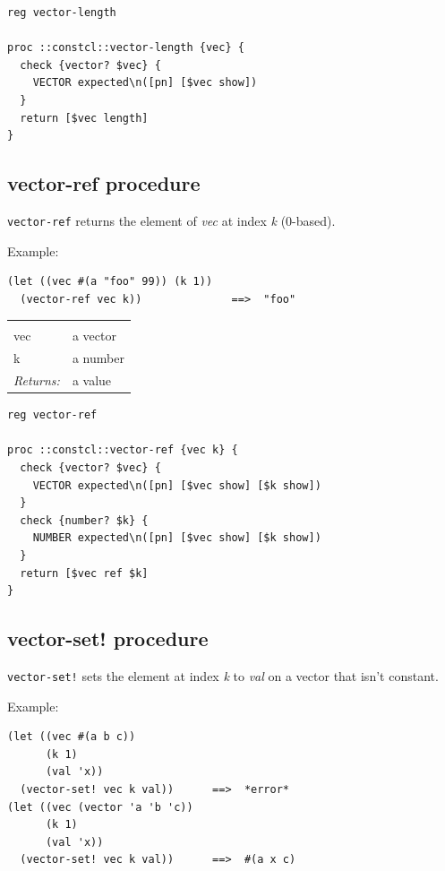 \documentclass[twoside]{report}
\begin{document}
\begin{lstlisting}
reg vector-length

proc ::constcl::vector-length {vec} {
  check {vector? $vec} {
    VECTOR expected\n([pn] [$vec show])
  }
  return [$vec length]
}
\end{lstlisting}

\subsection{vector-ref procedure}
\label{vectorref-procedure}

\texttt{vector-ref} returns the element of \emph{vec} at index \emph{k} (0-based).

Example:

\begin{verbatim}
(let ((vec #(a "foo" 99)) (k 1))
  (vector-ref vec k))              ==>  "foo"
\end{verbatim}

\noindent\begin{tabular}{ |p{1.9cm} p{8cm}| }
\hline
\rowcolor[HTML]{CCCCCC} \multicolumn{2}{|l|}{\bf vector-ref (public)} \\
vec & a vector \\
k & a number \\
\textit{Returns:} & a value \\
\hline
\end{tabular}

\begin{lstlisting}
reg vector-ref

proc ::constcl::vector-ref {vec k} {
  check {vector? $vec} {
    VECTOR expected\n([pn] [$vec show] [$k show])
  }
  check {number? $k} {
    NUMBER expected\n([pn] [$vec show] [$k show])
  }
  return [$vec ref $k]
}
\end{lstlisting}

\subsection{vector-set! procedure}
\label{vectorset-procedure}

\texttt{vector-set!} sets the element at index \emph{k} to \emph{val} on a vector that isn't constant.

Example:

\begin{verbatim}
(let ((vec #(a b c))
      (k 1)
      (val 'x))
  (vector-set! vec k val))      ==>  *error*
(let ((vec (vector 'a 'b 'c))
      (k 1)
      (val 'x))
  (vector-set! vec k val))      ==>  #(a x c)
\end{verbatim}
\end{document}
